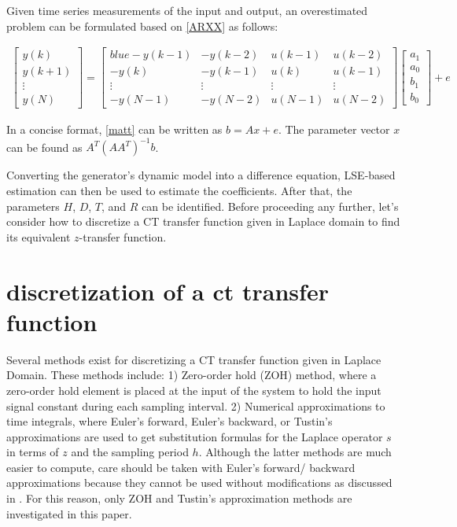 \documentclass[10pt,journal,final]{IEEEtran}
\begin{document}
Given time series measurements of the input and output, an overestimated problem can be formulated based on \eqref{ARXX} as follows:
\begin{scriptsize}
\begin{align}\label{matt}
\begin{bmatrix}
y(k) \\ y(k+1) \\ \vdots \\ y(N)
\end{bmatrix}
 = \begin{bmatrix}
{blue}{-}y(k-1) & {-}y(k-2)& u(k-1) & u(k-2)  \\
{-}y(k)   & {-}y(k-1) &u(k) & u(k-1)  \\
\vdots   & \vdots &\vdots &\vdots\\
{-}y(N-1) &{-}y(N-2)  & u(N-1) & u(N-2)
\end{bmatrix}
\begin{bmatrix}
a_1  \\ a_0\\  b_1 \\ b_0
\end{bmatrix}
+e
\end{align}
\end{scriptsize}
In a concise format, \eqref{matt} can be written as $b=Ax+e$. The parameter vector $x$ can be found as $A^T(AA^T)^{-1}b$.

Converting the generator's dynamic model into a difference equation, LSE-based estimation can then be used to estimate the coefficients. After that, the parameters $H$, $D$, $T$, and $R$ can be identified. Before proceeding any further, let's consider how to discretize a CT transfer function given in Laplace domain to find its equivalent $z$-transfer function.
\section{discretization of a ct transfer function}\label{discretization}
Several methods exist for discretizing a CT transfer function given in Laplace Domain. These methods include: 1) Zero-order hold (ZOH) method, where a zero-order hold element is placed at the input of the system to hold the input signal constant during each sampling interval. 2) {Numerical} approximations to time integrals, where Euler's forward, Euler's backward, or Tustin's approximations are used to get substitution {formulas} for the Laplace operator $s$ in terms of $z$ and the sampling period $h$. Although the latter methods are much easier to compute, care should be taken with Euler's forward/ backward approximations because they cannot be used without modifications as discussed in \cite{soderstrom1997least}. For this reason, only ZOH and Tustin's approximation methods are investigated in this paper.
\end{document}
